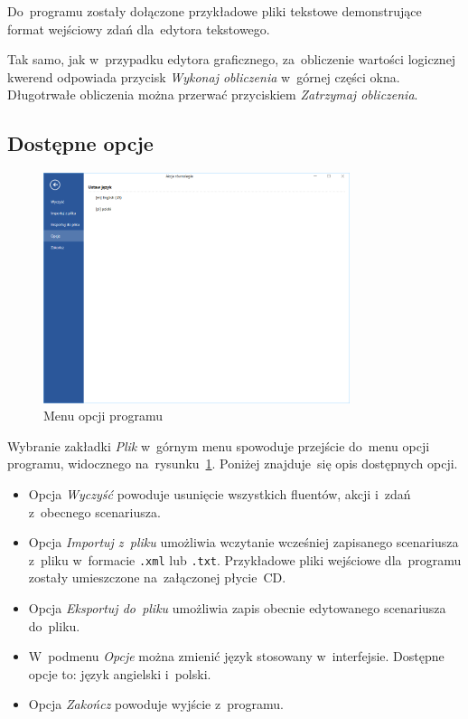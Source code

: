 \documentclass[11pt,a4paper]{article}
\begin{document}
Do~programu zostały dołączone przykładowe pliki tekstowe demonstrujące format wejściowy zdań dla~edytora tekstowego.

Tak samo, jak w~przypadku edytora graficznego, za~obliczenie wartości logicznej kwerend odpowiada przycisk \emph{Wykonaj obliczenia} w~górnej części okna.
Długotrwałe obliczenia można przerwać przyciskiem \emph{Zatrzymaj obliczenia}.

\subsection{Dostępne opcje}

\begin{figure}[H]
    \centering
    \includegraphics[width=0.8\textwidth]{res/img/options.png}
    \caption{Menu opcji programu}
    \label{fig:options}
\end{figure}

Wybranie zakładki \emph{Plik} w~górnym menu spowoduje przejście do~menu opcji programu, widocznego na~rysunku~\ref{fig:options}.
Poniżej znajduje~się opis dostępnych opcji.

\begin{itemize}
    \item Opcja \emph{Wyczyść} powoduje usunięcie wszystkich fluentów, akcji i~zdań z~obecnego scenariusza.
    \item Opcja \emph{Importuj z~pliku} umożliwia wczytanie wcześniej zapisanego scenariusza z~pliku w~formacie \verb+.xml+ lub \verb+.txt+.
    Przykładowe pliki wejściowe dla~programu zostały umieszczone na~załączonej płycie~CD.
    \item Opcja \emph{Eksportuj do~pliku} umożliwia zapis obecnie edytowanego scenariusza do~pliku.
    \item W~podmenu \emph{Opcje} można zmienić język stosowany w~interfejsie.
    Dostępne opcje to: język angielski i~polski.
    \item Opcja \emph{Zakończ} powoduje wyjście z~programu.
\end{itemize}
\end{document}
